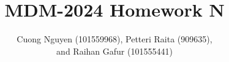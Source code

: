 \documentclass[a4paper,12pt]{article}
\title{MDM-2024 Homework N}
\author{Cuong Nguyen (101559968), Petteri Raita (909635),\\and Raihan Gafur (101555441)}
\begin{document}
\maketitle
\tableofcontents
\newpage

\listoffigures
\newpage

% 

% 

% 
% 
% 

\printbibliography{}

%     
\end{document}
